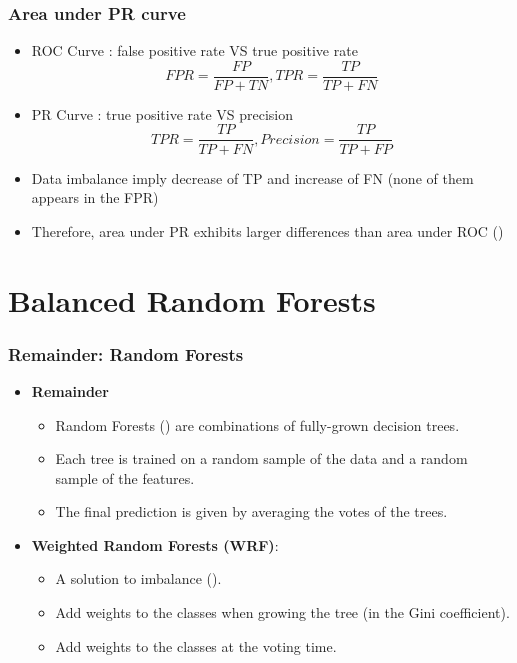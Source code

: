 \documentclass[slidestop,compress,red,mathserif]{beamer}
\begin{document}
\begin{frame}
	\frametitle{Area under PR curve}
	\begin{itemize}
    \item ROC Curve : false positive rate VS true positive rate
    \begin{equation*}
			FPR = \frac{FP}{FP+TN},  TPR = \frac{TP}{TP+FN}
		\end{equation*}
		\item PR Curve : true positive rate VS precision
    \begin{equation*}
			TPR = \frac{TP}{TP+FN},  Precision = \frac{TP}{TP+FP}
		\end{equation*}
    \item Data imbalance imply decrease of TP and increase of FN (none of them appears in the FPR)
    \item Therefore, area under PR exhibits larger differences than area under ROC (\cite{Davis2006})
	\end{itemize}
\end{frame}


\section{Balanced Random Forests}

\begin{frame}
\frametitle{Remainder: Random Forests}
\begin{itemize}
  \item[] \textbf{Remainder}
    \begin{itemize}
    	\item Random Forests (\cite{Breiman2001}) are combinations of fully-grown decision trees.
    	\item Each tree is trained on a random sample of the data and a random sample of the features.
      \item The final prediction is given by averaging the votes of the trees.
    \end{itemize}

  \item[] \textbf{Weighted Random Forests (WRF)}:
    \begin{itemize}
      \item A solution to imbalance (\cite{Chen2004}).
      \item Add weights to the classes when growing the tree (in the Gini coefficient).
      \item Add weights to the classes at the voting time.
    \end{itemize}

\end{itemize}
~~~~~~~~~~~~~~~
\end{frame}
\end{document}
